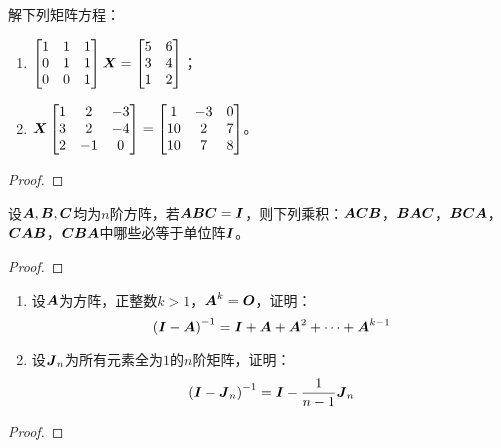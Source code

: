\begin{problem}
解下列矩阵方程：
\begin{enumerate}
    \item \(\begin{bmatrix}1&1&1\\0&1&1\\0&0&1\end{bmatrix}\boldsymbol{X}=\begin{bmatrix}5&6\\3&4\\1&2\end{bmatrix}\)；
    \item \(\boldsymbol{X}\begin{bmatrix}
              1 & 2  & -3 \\
              3 & 2  & -4 \\
              2 & -1 & 0
          \end{bmatrix}=\begin{bmatrix}
              1  & -3 & 0 \\
              10 & 2  & 7 \\
              10 & 7  & 8
          \end{bmatrix}\)。
\end{enumerate}
\end{problem}
\begin{proof}

\end{proof}

\begin{problem}
设\(\boldsymbol{A},\boldsymbol{B},\boldsymbol{C}\)均为\(n\)阶方阵，若\(\boldsymbol{A}\boldsymbol{B}\boldsymbol{C}=\boldsymbol{I}\)，则下列乘积：\(\boldsymbol{A}\boldsymbol{C}\boldsymbol{B}\)，\(\boldsymbol{B}\boldsymbol{A}\boldsymbol{C}\)，\(\boldsymbol{B}\boldsymbol{C}\boldsymbol{A}\)，\(\boldsymbol{C}\boldsymbol{A}\boldsymbol{B}\)，\(\boldsymbol{C}\boldsymbol{B}\boldsymbol{A}\)中哪些必等于单位阵\(\boldsymbol{I}\)。
\end{problem}
\begin{proof}

\end{proof}

\begin{problem}
\begin{enumerate}
    \item 设\(\boldsymbol{A}\)为方阵，正整数\(k>1\)，\(\boldsymbol{A}^k=\boldsymbol{O}\)，证明：
          \begin{equation*}
              {\left( \boldsymbol{I}-\boldsymbol{A}\right)}^{-1}=\boldsymbol{I}+\boldsymbol{A}+\boldsymbol{A}^2+\cdots+\boldsymbol{A}^{k-1}
          \end{equation*}
    \item 设\(\boldsymbol{J}_n\)为所有元素全为\(1\)的\(n\)阶矩阵，证明：
          \begin{equation*}
              {\left( \boldsymbol{I}-\boldsymbol{J}_n \right)}^{-1}=\boldsymbol{I}-\frac{1}{n-1}\boldsymbol{J}_n
          \end{equation*}
\end{enumerate}
\end{problem}
\begin{proof}

\end{proof}

